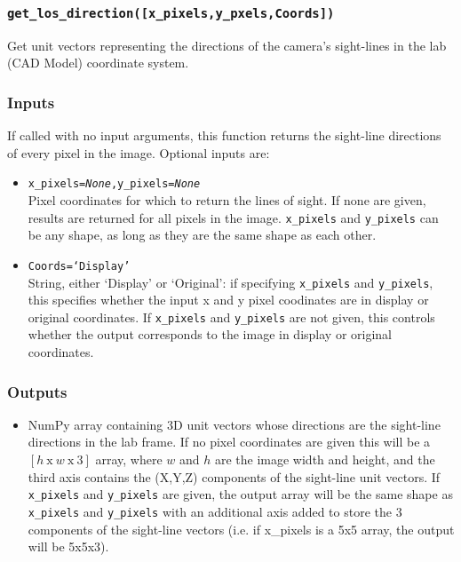 \documentclass[12pt]{article}
\newcommand{\code}[1]{\texttt{#1}}
\begin{document}
\subsubsection*{\code{get\_los\_direction([x\_pixels,y\_pxels,Coords])}}
\begin{adjustwidth}{0.5cm}{0cm}
Get unit vectors representing the directions of the camera's sight-lines in the lab (CAD Model) coordinate system.
\subsubsection*{Inputs}
If called with no input arguments, this function returns the sight-line directions of every pixel in the image. Optional inputs are:
\begin{itemize}
\item{\code{x\_pixels={\it None},y\_pixels={\it None}}\\Pixel coordinates for which to return the lines of sight. If none are given, results are returned for all pixels in the image. \code{x\_pixels} and \code{y\_pixels} can be any shape, as long as they are the same shape as each other.}
\item{\code{Coords=`Display'}\\String, either `Display' or `Original': if specifying \code{x\_pixels} and \code{y\_pixels}, this specifies whether the input x and y pixel coodinates are in display or original coordinates. If \code{x\_pixels} and \code{y\_pixels} are not given, this controls whether the output corresponds to the image in display or original coordinates. }
\end{itemize}
\subsubsection*{Outputs} 
\begin{itemize}
\item{NumPy array containing 3D unit vectors whose directions are the sight-line directions in the lab frame. If no pixel coordinates are given this will be a $[h\: \mathrm{x} \: w \: \mathrm{x}\: 3]$ array, where $w$ and $h$ are the image width and height, and the third axis contains the (X,Y,Z) components of the sight-line unit vectors. If \code{x\_pixels} and \code{y\_pixels} are given, the output array will be the same shape as \code{x\_pixels} and \code{y\_pixels} with an additional axis added to store the 3 components of the sight-line vectors (i.e. if x\_pixels is a 5x5 array, the output will be 5x5x3). }
\end{itemize}
\end{adjustwidth}
\end{document}

